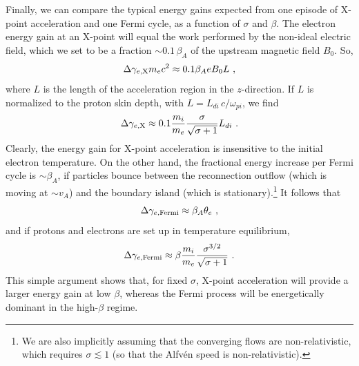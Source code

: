 Finally, we can compare the typical energy gains expected from one episode of X-point acceleration and one Fermi cycle, as a function of $\sigma$ and $\beta$. The electron energy gain at an X-point will equal the work performed by the non-ideal electric field, which we set to be a fraction $\sim 0.1\,\beta_{A}$ of the upstream magnetic field $B_0$. So,
\begin{equation}
\Delta\gamma_{e,\rm X} m_{e} c^{2} \approx  0.1 \beta_{A} e B_{0} L~,
\end{equation}
where $L$ is the length of the acceleration region in the $z$-direction. If $L$ is normalized to the proton skin depth, with $L=L_{di} \,c/\omega_{pi}$, we find
\begin{equation}\label{xpoint-gain-temp}
\Delta \gamma_{e,\rm X} \approx  0.1 \frac{m_{i}}{m_{e}} \frac{\sigma}{\sqrt{\sigma+1}} L_{di}~.
\end{equation}
Clearly, the energy gain for X-point acceleration is insensitive to the initial electron temperature. On the other hand, the fractional energy increase per Fermi cycle is $\sim \beta_A$, if particles bounce between the reconnection outflow (which is moving at $\sim v_A$) and the boundary island (which is stationary).\footnote{We are also implicitly assuming that the converging flows are non-relativistic, which requires $\sigma\lesssim 1$ (so that the Alfv\'en speed is non-relativistic).} It follows that
\begin{equation}\label{fermi}
\Delta \gamma_{e,\rm Fermi}\approx \beta_A \theta_e~,
\end{equation}
and if protons and electrons are set up in temperature equilibrium, 
\begin{equation}\label{fermi}
\Delta \gamma_{e,\rm Fermi}\approx \beta \frac{m_i}{m_e} \frac{\sigma^{3/2}}{\sqrt{\sigma+1}}~.
\end{equation}
This simple argument shows that, for fixed $\sigma$, X-point acceleration will provide a larger energy gain at low $\beta$, whereas the Fermi process will be energetically dominant in the high-$\beta$ regime.




